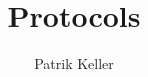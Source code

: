 \documentclass[a4paper]{article}
\theoremstyle{definition}
\begin{document}
\title{Protocols}
\author{Patrik Keller}

\maketitle




\end{document}
